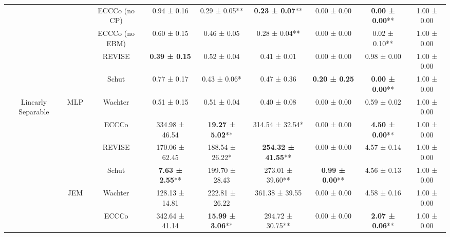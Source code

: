\begin{table}
{\begin{tabular}[t]{ccccccccc}
 &  & ECCCo (no CP) & 0.94 ± 0.16\hphantom{*}\hphantom{*} & 0.29 ± 0.05** & \textbf{0.23 ± 0.07}** & 0.00 ± 0.00\hphantom{*}\hphantom{*} & \textbf{0.00 ± 0.00}** & 1.00 ± 0.00\hphantom{*}\hphantom{*}\\

 &  & ECCCo (no EBM) & 0.60 ± 0.15\hphantom{*}\hphantom{*} & 0.46 ± 0.05\hphantom{*}\hphantom{*} & 0.28 ± 0.04** & 0.00 ± 0.00\hphantom{*}\hphantom{*} & 0.02 ± 0.10** & 1.00 ± 0.00\hphantom{*}\hphantom{*}\\

 &  & REVISE & \textbf{0.39 ± 0.15}\hphantom{*}\hphantom{*} & 0.52 ± 0.04\hphantom{*}\hphantom{*} & 0.41 ± 0.01\hphantom{*}\hphantom{*} & 0.00 ± 0.00\hphantom{*}\hphantom{*} & 0.98 ± 0.00\hphantom{*}\hphantom{*} & 1.00 ± 0.00\hphantom{*}\hphantom{*}\\

 &  & Schut & 0.77 ± 0.17\hphantom{*}\hphantom{*} & 0.43 ± 0.06*\hphantom{*} & 0.47 ± 0.36\hphantom{*}\hphantom{*} & \textbf{0.20 ± 0.25}\hphantom{*}\hphantom{*} & \textbf{0.00 ± 0.00}** & 1.00 ± 0.00\hphantom{*}\hphantom{*}\\

\multirow[t]{-12}{*}{\centering\arraybackslash Linearly Separable} & \multirow[t]{-6}{*}{\centering\arraybackslash MLP} & Wachter & 0.51 ± 0.15\hphantom{*}\hphantom{*} & 0.51 ± 0.04\hphantom{*}\hphantom{*} & 0.40 ± 0.08\hphantom{*}\hphantom{*} & 0.00 ± 0.00\hphantom{*}\hphantom{*} & 0.59 ± 0.02\hphantom{*}\hphantom{*} & 1.00 ± 0.00\hphantom{*}\hphantom{*}\\
\cmidrule{1-9}
 &  & ECCCo & 334.98 ± 46.54\hphantom{*}\hphantom{*} & \textbf{19.27 ± 5.02}** & 314.54 ± 32.54*\hphantom{*} & 0.00 ± 0.00\hphantom{*}\hphantom{*} & \textbf{4.50 ± 0.00}** & 1.00 ± 0.00\hphantom{*}\hphantom{*}\\

 &  & REVISE & 170.06 ± 62.45\hphantom{*}\hphantom{*} & 188.54 ± 26.22*\hphantom{*} & \textbf{254.32 ± 41.55}** & 0.00 ± 0.00\hphantom{*}\hphantom{*} & 4.57 ± 0.14\hphantom{*}\hphantom{*} & 1.00 ± 0.00\hphantom{*}\hphantom{*}\\

 &  & Schut & \textbf{7.63 ± 2.55}** & 199.70 ± 28.43\hphantom{*}\hphantom{*} & 273.01 ± 39.60** & \textbf{0.99 ± 0.00}** & 4.56 ± 0.13\hphantom{*}\hphantom{*} & 1.00 ± 0.00\hphantom{*}\hphantom{*}\\

 & \multirow[t]{-4}{*}{\centering\arraybackslash JEM} & Wachter & 128.13 ± 14.81\hphantom{*}\hphantom{*} & 222.81 ± 26.22\hphantom{*}\hphantom{*} & 361.38 ± 39.55\hphantom{*}\hphantom{*} & 0.00 ± 0.00\hphantom{*}\hphantom{*} & 4.58 ± 0.16\hphantom{*}\hphantom{*} & 1.00 ± 0.00\hphantom{*}\hphantom{*}\\
\cmidrule{2-9}
 &  & ECCCo & 342.64 ± 41.14\hphantom{*}\hphantom{*} & \textbf{15.99 ± 3.06}** & 294.72 ± 30.75** & 0.00 ± 0.00\hphantom{*}\hphantom{*} & \textbf{2.07 ± 0.06}** & 1.00 ± 0.00\hphantom{*}\hphantom{*}\\


\end{tabular}}
\end{table}
